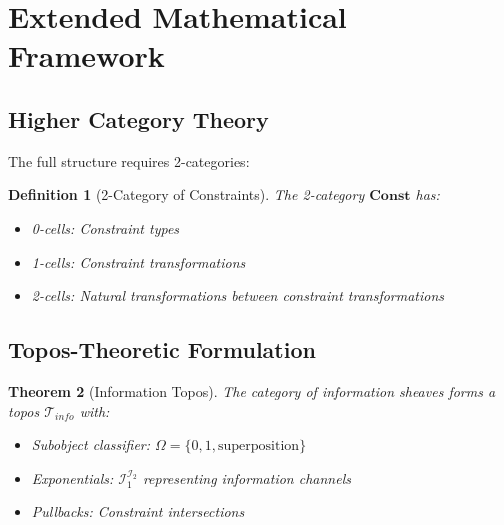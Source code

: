 \documentclass[12pt,a4paper]{article}
\newtheorem{theorem}{Theorem}[section]
\newtheorem{definition}[theorem]{Definition}
\begin{document}
\section{Extended Mathematical Framework}

\subsection{Higher Category Theory}

The full structure requires 2-categories:

\begin{definition}[2-Category of Constraints]
The 2-category $\mathbf{Const}$ has:
\begin{itemize}
\item 0-cells: Constraint types
\item 1-cells: Constraint transformations
\item 2-cells: Natural transformations between constraint transformations
\end{itemize}
\end{definition}

\subsection{Topos-Theoretic Formulation}

\begin{theorem}[Information Topos]
The category of information sheaves forms a topos $\mathcal{T}_{info}$ with:
\begin{itemize}
\item Subobject classifier: $\Omega = \{0, 1, \text{superposition}\}$
\item Exponentials: $\mathcal{I}_1^{\mathcal{I}_2}$ representing information channels
\item Pullbacks: Constraint intersections
\end{itemize}
\end{theorem}



\end{document}
